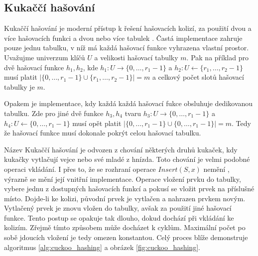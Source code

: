 \subsection{Kukaččí hašování}

Kukaččí hašování je moderní přístup k řešení hašovacích kolizí, za použití dvou a více hašovacích
funkci a dvou nebo více tabulek \cite{Cuckoo_hashing}. Častá implementace zahruje pouze jednu
tabulku, v níž má každá hašovací funkce vyhrazena vlastní prostor. Uvažujme univerzum klíčů $U$
a velikosti hašovací tabulky $m$. Pak na příklad pro dvě hašovací funkce 
$h_1, h_2$, kde $h_1 : U \rightarrow \{0,\ldots,r_1-1\}$ a $h_2 : U \leftarrow \{r_1,\ldots,r_2-1\}$ musí platit
$|\{0,\ldots,r_1-1\} \cup \{r_1,\ldots,r_2-1\}| = m$ a celkový počet slotů hašovací tabulky je $m$.

Opakem je implementace, kdy každá každá hašovací fukce obsluhuje dedikovanou tabulku. Zde pro
jiné dvě funkce $h_3, h_4$ tvaru $h_3 : U \rightarrow \{0,\ldots,r_1-1\}$ a $h_4 : U \leftarrow \{0,\ldots,r_1-1\}$
musí opět platit $|\{0,\ldots,r_1-1\} \cup \{0,\ldots,r_1-1\}| = m$. Tedy že hašovací funkce musí dokonale pokrýt
celou hašovací tabulku.

Název Kukaččí hašování je odvozen z chování některých druhů kukaček, kdy kukačky vytlačují vejce nebo své mladé
z hnízda. Toto chování je velmi podobné operaci vkládání. I přes to, že se rozhraní operace $Insert(S,x)$ nemění 
, výrazně se mění její vnitřní implementace. Operace vložení prvku do tabulky, vybere jednu z dostupných hašovacích
funkcí a pokusí se vložit prvek na příslušné místo. Dojde-li ke kolizi, původní prvek je vytlačen a nahrazen prvkem novým.
Vytlačený prvek je znovu vložen do tabulky, avšak za použití jiné hašovací funkce. Tento postup se opakuje tak dlouho, dokud
dochází při vkládání ke kolizím. Zřejmě tímto způsobem může docházet k cyklům. Maximální počet po sobě jdoucích vložení je tedy
omezen konstantou. Celý proces blíže demonstruje algoritmus \ref{alg:cuckoo_hashing} a obrázek \ref{fig:cuckoo_hashing}.

